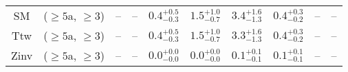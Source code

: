 \begin{table}[h!]
{\begin{tabular}{cccccccccc}
	SM & ($\ge5$a, $\ge3$) & -- & -- & $0.4^{+ 0.5 }_{- 0.3 }$ & $1.5^{+ 1.0 }_{- 0.7 }$ & $3.4^{+ 1.6 }_{- 1.3 }$ & $0.4^{+ 0.3 }_{- 0.2 }$ & -- & -- \\[0.5ex] 
	Ttw & ($\ge5$a, $\ge3$) & -- & -- & $0.4^{+ 0.5 }_{- 0.3 }$ & $1.5^{+ 1.0 }_{- 0.7 }$ & $3.3^{+ 1.6 }_{- 1.3 }$ & $0.4^{+ 0.3 }_{- 0.2 }$ & -- & -- \\[0.5ex] 
	Zinv & ($\ge5$a, $\ge3$) & -- & -- & $0.0^{+ 0.0 }_{- 0.0 }$ & $0.0^{+ 0.0 }_{- 0.0 }$ & $0.1^{+ 0.1 }_{- 0.1 }$ & $0.1^{+ 0.1 }_{- 0.1 }$ & -- & -- \\[0.5ex] 
	\hline
	\hline
\end{tabular}}
\end{table}

